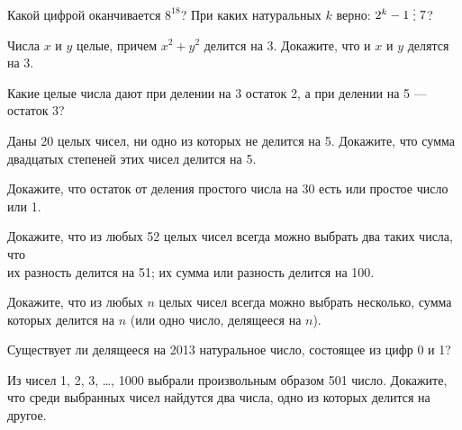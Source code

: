 \documentclass[a4paper,12pt]{article}
\newcommand{\del}{\mathrel{\raisebox{-.3 ex}{${\vdots}$}}}
\begin{document}
Какой цифрой оканчивается %
$8^{18}$?
При каких натуральных $k$ верно: $2^k-1\del7$?

Числа $x$ и $y$ целые, причем $x^2+y^2$ делится на 3.
Докажите, что и $x$ и $y$ делятся на 3.

Какие целые числа дают при делении на 3 остаток 2,
а при делении на 5 --- остаток 3?

Даны 20 целых чисел, ни одно из которых не делится на 5. Докажите, что
сумма двадцатых степеней этих чисел делится на 5.

Докажите, что остаток от деления простого  числа на 30 есть или простое
число или 1.

Докажите, что из любых 52 целых чисел всегда можно выбрать два
таких числа, что\\
их разность делится на 51;
их сумма или разность делится на 100.

Докажите, что из любых $n$ целых чисел всегда можно выбрать несколько,
сумма которых делится на $n$ (или одно число, делящееся на $n$).

Существует ли делящееся на 2013 натуральное число,
состоящее из цифр 0 и 1?

Из чисел 1, 2, 3, \dots , 1000 выбрали произвольным образом 501 число.
Докажите, что среди выбранных чисел найдутся два числа, одно из которых
делится на другое.



\end{document}
